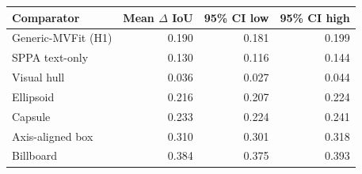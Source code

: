 \begin{tabular}{@{}lrrr@{}}
\toprule
Comparator & Mean $\Delta$ IoU & 95\% CI low & 95\% CI high \\
\midrule
Generic-MVFit (H1) & 0.190 & 0.181 & 0.199 \\
SPPA text-only & 0.130 & 0.116 & 0.144 \\
Visual hull & 0.036 & 0.027 & 0.044 \\
Ellipsoid & 0.216 & 0.207 & 0.224 \\
Capsule & 0.233 & 0.224 & 0.241 \\
Axis-aligned box & 0.310 & 0.301 & 0.318 \\
Billboard & 0.384 & 0.375 & 0.393 \\
\bottomrule
\end{tabular}
